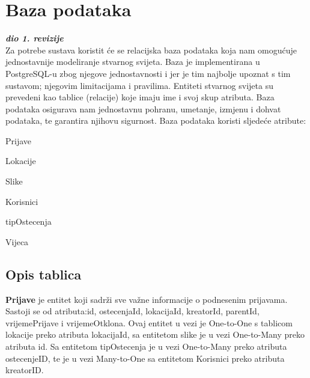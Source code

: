 	
		

		

				
		\section{Baza podataka}
			
			\textbf{\textit{dio 1. revizije}}\\
			
		Za potrebe sustava koristit će se relacijska baza podataka koja nam omogućuje jednostavnije modeliranje stvarnog svijeta. Baza je implementirana u PostgreSQL-u zbog njegove jednostavnosti i jer je tim najbolje upoznat s tim sustavom; njegovim limitacijama i pravilima. Entiteti stvarnog svijeta su prevedeni kao tablice (relacije) koje imaju ime i svoj skup atributa. Baza podataka osigurava nam jednostavnu pohranu, umetanje, izmjenu i dohvat podataka, te garantira njihovu sigurnost. Baza podataka koristi sljedeće atribute:
		\begin{packed_item}
		\setlength\itemindent{24pt}
		\item Prijave
		\item Lokacije
		\item Slike
		\item Korisnici
		\item tipOstecenja
		\item Vijeca
		\end{packed_item}
		
		
			\subsection{Opis tablica}
			

				\textbf{Prijave} je entitet koji sadrži sve važne informacije o podnesenim prijavama. Sastoji se od atributa:id, ostecenjaId, lokacijaId, kreatorId, parentId, vrijemePrijave i vrijemeOtklona. Ovaj entitet u vezi je One-to-One s tablicom lokacije preko atributa lokacijaId, sa entitetom slike je u vezi One-to-Many preko atributa id. Sa entitetom tipOstecenja je u vezi One-to-Many preko atributa ostecenjeID, te je u vezi Many-to-One sa entitetom Korisnici preko atributa kreatorID.\\
				
